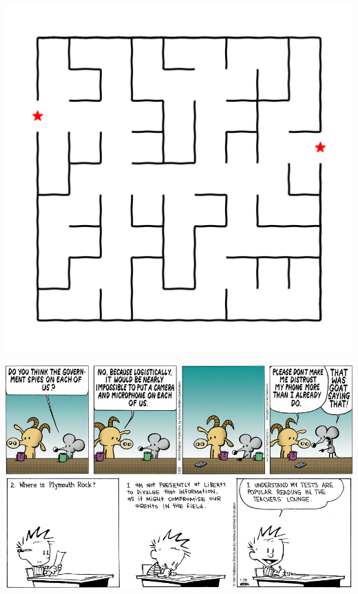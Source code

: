 \documentclass[landscape]{article}
\begin{document}
\begin{multicols}{3}
\center\includegraphics[width=0.95\linewidth]{images/maze_r.png}

\renewcommand*\sudokuformat[1]{\sffamily#1}
\setlength{}
\setlength\sudokuthickline{1pt}
\begin{center}
	
\end{center}

\center\includegraphics[width=\linewidth]{images/comic-pearls.png}
\center\includegraphics[width=\linewidth]{images/comic-calvinandhobbes.png}

\end{multicols}
\end{document}
